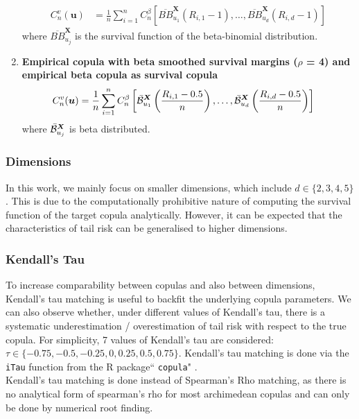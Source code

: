 \documentclass[12pt]{report}
\newcommand{\1}{\mathbf{1}}
\begin{document}
\begin{flushleft}
\begin{enumerate}
\begin{align*}
C_{n}^{v}(\boldsymbol{u}) &= \frac{1}{n} \sum\limits_{i = 1}^{n} C_{n}^{\beta} \left[\overline{BB}_{u_{1}}^{\boldsymbol{X}}\left(R_{i,1} - 1\right), \dots, \overline{BB}_{u_{d}}^{\boldsymbol{X}}\left(R_{i,d} - 1\right) \right]
\end{align*}
where $\overline{BB}_{u_{j}}^{\boldsymbol{X}}$ is the survival function of the beta-binomial distribution.
\item \textbf{Empirical copula with beta smoothed survival margins ($\rho$ = 4) and empirical beta copula as survival copula}
\begin{align*}
C_{n}^{v}(\boldsymbol{u}) &= \frac{1}{n} \sum\limits_{i = 1}^{n} C_{n}^{\beta} \left[\Bar{\mathcal{B}}_{u_{1}}^{\boldsymbol{X}}\left(\frac{R_{i,1} - 0.5}{n}\right), \dots, \Bar{\mathcal{B}}_{u_{d}}^{\boldsymbol{X}}\left(\frac{R_{i,d} - 0.5}{n}\right) \right]
\end{align*}
where $\Bar{\mathcal{B}}_{u_{j}}^{\boldsymbol{X}}$ is beta distributed.
\end{enumerate}

\subsubsection{Dimensions}

In this work, we mainly focus on smaller dimensions, which include $d \in \{ 2, 3, 4, 5 \}$. This is due to the computationally prohibitive nature of computing the survival function of the target copula analytically. However, it can be expected that the characteristics of tail risk can be generalised to higher dimensions.

\subsubsection{Kendall's Tau}
To increase comparability between copulas and also between dimensions, Kendall's tau matching is useful to backfit the underlying copula parameters. We can also observe whether, under different values of Kendall's tau, there is a systematic underestimation / overestimation of tail risk with respect to the true copula. For simplicity, 7 values of Kendall's tau are considered: $\tau \in \{ -0.75, -0.5, -0.25, 0, 0.25, 0.5, 0.75 \}$. Kendall's tau matching is done via the \texttt{iTau} function from the  \textsf{R} package`` \texttt{copula}" \parencite{copulaRPackage2023}. \\
\vspace{0.5cm}
Kendall's tau matching is done instead of Spearman's Rho matching, as there is no analytical form of spearman's rho for most archimedean copulas and can only be done by numerical root finding.


\end{flushleft}
\end{document}
